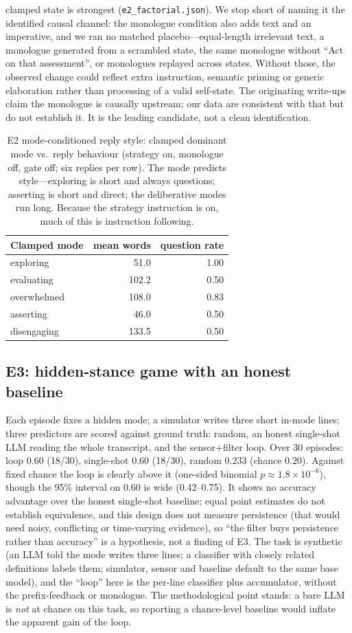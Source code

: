 \documentclass[11pt]{article}
\begin{document}
clamped state is strongest (\texttt{e2\_factorial.json}). We stop short of
naming it the identified causal channel: the monologue condition also adds
text and an imperative, and we ran no matched placebo---equal-length irrelevant
text, a monologue generated from a scrambled state, the same monologue without
``Act on that assessment'', or monologues replayed across states. Without
those, the observed change could reflect extra instruction, semantic priming or
generic elaboration rather than processing of a valid self-state. The
originating write-ups claim the monologue is causally upstream; our data are
consistent with that but do not establish it. It is the leading candidate, not
a clean identification.

\begin{table}[t]
\centering
\begin{tabular}{lrr}
\toprule
Clamped mode & mean words & question rate \\
\midrule
exploring    & 51.0  & 1.00 \\
evaluating   & 102.2 & 0.50 \\
overwhelmed  & 108.0 & 0.83 \\
asserting    & 46.0  & 0.50 \\
disengaging  & 133.5 & 0.50 \\
\bottomrule
\end{tabular}
\caption{E2 mode-conditioned reply style: clamped dominant mode vs.\ reply
behaviour (strategy on, monologue off, gate off; six replies per row). The mode
predicts style---exploring is short and always questions; asserting is short
and direct; the deliberative modes run long. Because the strategy instruction
is on, much of this is instruction following.}
\label{tab:calib}
\end{table}

\subsection{E3: hidden-stance game with an honest baseline}
Each episode fixes a hidden mode; a simulator writes three short in-mode lines;
three predictors are scored against ground truth: random, an honest single-shot
LLM reading the whole transcript, and the sensor+filter loop. Over 30 episodes:
loop $0.60$ (18/30), single-shot $0.60$ (18/30), random $0.233$ (chance
$0.20$). Against fixed chance the loop is clearly above it (one-sided binomial
$p\approx1.8\times10^{-6}$), though the 95\% interval on $0.60$ is wide
(0.42--0.75). It shows no accuracy advantage over the honest single-shot
baseline; equal point estimates do not establish equivalence, and this design
does not measure persistence (that would need noisy, conflicting or time-varying
evidence), so ``the filter buys persistence rather than accuracy'' is a
hypothesis, not a finding of E3. The task is synthetic (an LLM told the mode
writes three lines; a classifier with closely related definitions labels them;
simulator, sensor and baseline default to the same base model), and the ``loop''
here is the per-line classifier plus accumulator, without the prefix-feedback
or monologue. The methodological point stands: a bare LLM is \emph{not} at
chance on this task, so reporting a chance-level baseline would inflate the
apparent gain of the loop.
\end{document}
